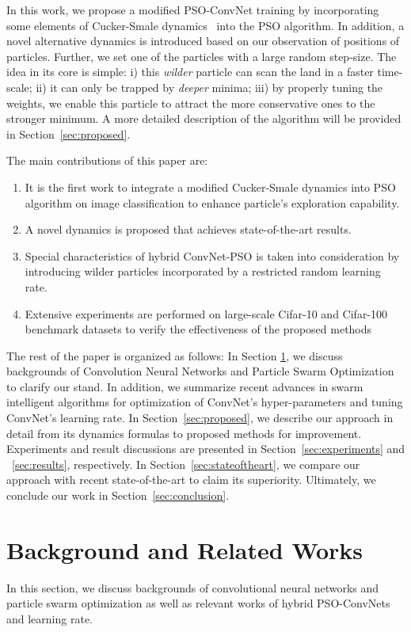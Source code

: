 \documentclass{ieeeaccess}
\begin{document}
In this work, we propose a modified PSO-ConvNet training by incorporating some elements of Cucker-Smale dynamics~\cite{cucker2007emergent} into the PSO algorithm. In addition, a novel alternative dynamics is introduced based on our observation of positions of particles. Further, we set one of the particles with a large random step-size. The idea in its core is simple: i) this \emph{wilder} particle can scan the land in a faster time-scale; ii) it can only be trapped by \emph{deeper} minima; iii) by properly tuning the weights, we enable this particle to attract the more conservative ones to the stronger minimum. A more detailed description of the algorithm will be provided in Section~\ref{sec:proposed}.

The main contributions of this paper are:
\begin{enumerate}   
\item It is the first work to integrate a modified Cucker-Smale dynamics into PSO algorithm on image classification to enhance particle's exploration capability.  
\item A novel dynamics is proposed that achieves state-of-the-art results.
\item Special characteristics of hybrid ConvNet-PSO is taken into consideration by introducing wilder particles incorporated by a restricted random learning rate.
\item Extensive experiments are performed on large-scale Cifar-10 and Cifar-100 benchmark datasets to verify the effectiveness of the proposed methods
\end{enumerate}  

The rest of the paper is organized as follows: In Section \ref{sec:background}, we discuss backgrounds of Convolution Neural Networks and Particle Swarm Optimization to clarify our stand. In addition, we summarize recent advances in swarm intelligent algorithms for optimization of ConvNet's hyper-parameters and tuning ConvNet's learning rate. In Section~\ref{sec:proposed}, we describe our approach in detail from its dynamics formulas to proposed methods for improvement. Experiments and result discussions are presented in Section~\ref{sec:experiments} and ~\ref{sec:results}, respectively. In Section~\ref{sec:stateoftheart}, we compare our approach with recent state-of-the-art to claim its superiority. Ultimately, we conclude our work in Section~\ref{sec:conclusion}.
\section{Background and Related Works}
\label{sec:background}
In this section, we discuss backgrounds of convolutional neural networks and particle swarm optimization as well as relevant works of hybrid PSO-ConvNets and learning rate.
\end{document}
